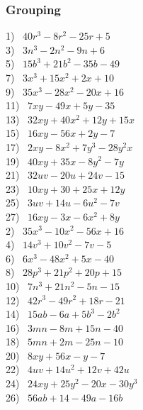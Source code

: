 
\subsubsection{Grouping}

{}

\begin{multicols}{2}
  1)~ $40 r^3 - 8 r^2 - 25 r + 5$\\
  3)~ $3 n^3 - 2 n^2 - 9 n + 6$\\
  5)~ $15 b^3 + 21 b^2 - 35 b - 49$\\
  7)~ $3 x^3 + 15 x^2 + 2 x + 10$\\
  9)~ $35 x^3 - 28 x^2 - 20 x + 16$\\
  11)~ $7 x y - 49 x + 5 y - 35$\\
  13)~ $32 x y + 40 x^2 + 12 y + 15 x$\\
  15)~ $16 x y - 56 x + 2 y - 7$\\
  17)~ $2 x y - 8 x^2 + 7 y^3 - 28 y^2 x$\\
  19)~ $40 x y + 35 x - 8 y^2 - 7 y$\\
  21)~ $32 u v - 20 u + 24 v - 15$\\
  23)~ $10 x y + 30 + 25 x + 12 y$\\
  25)~ $3 u v + 14 u - 6 u^2 - 7 v$\\
  27)~ $16 x y - 3 x - 6 x^2 + 8 y$\\
  2)~ $35 x^3 - 10 x^2 - 56 x + 16$\\
  4)~ $14 v^3 + 10 v^2 - 7 v - 5$\\
  6)~ $6 x^3 - 48 x^2 + 5 x - 40$\\
  8)~ $28 p^3 + 21 p^2 + 20 p + 15$\\
  10)~ $7 n^3 + 21 n^2 - 5 n - 15$\\
  12)~ $42 r^3 - 49 r^2 + 18 r - 21$\\
  14)~ $15 a b - 6 a + 5 b^3 - 2 b^2$\\
  16)~ $3 m n - 8 m + 15 n - 40$\\
  18)~ $5 m n + 2 m - 25 n - 10$\\
  20)~ $8 x y + 56 x - y - 7$\\
  22)~ $4 u v + 14 u^2 + 12 v + 42 u$\\
  24)~ $24 x y + 25 y^2 - 20 x - 30 y^3$\\
  26)~ $56 a b + 14 - 49 a - 16 b$
\end{multicols}

\newpage

